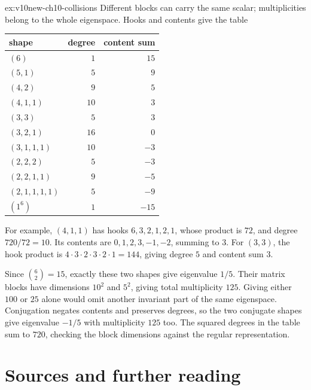 \begin{solution}{ex:v10new-ch10-collisions}
\idea Different blocks can carry the same scalar; multiplicities belong to the whole eigenspace.
\writeup Hooks and contents give the table
\begin{center}
\begin{tabular}{@{}lrr@{}}
shape&degree&content sum\\\hline
$(6)$&$1$&$15$\\
$(5,1)$&$5$&$9$\\
$(4,2)$&$9$&$5$\\
$(4,1,1)$&$10$&$3$\\
$(3,3)$&$5$&$3$\\
$(3,2,1)$&$16$&$0$\\
$(3,1,1,1)$&$10$&$-3$\\
$(2,2,2)$&$5$&$-3$\\
$(2,2,1,1)$&$9$&$-5$\\
$(2,1,1,1,1)$&$5$&$-9$\\
$(1^6)$&$1$&$-15$
\end{tabular}
\end{center}
For example, $(4,1,1)$ has hooks $6,3,2,1,2,1$, whose product is $72$, and degree $720/72=10$. Its contents are $0,1,2,3,-1,-2$, summing to $3$. For $(3,3)$, the hook product is $4\cdot3\cdot2\cdot3\cdot2\cdot1=144$, giving degree $5$ and content sum $3$.

Since $\binom62=15$, exactly these two shapes give eigenvalue $1/5$. Their matrix blocks have dimensions $10^2$ and $5^2$, giving total multiplicity $125$. Giving either $100$ or $25$ alone would omit another invariant part of the same eigenspace. Conjugation negates contents and preserves degrees, so the two conjugate shapes give eigenvalue $-1/5$ with multiplicity $125$ too. The squared degrees in the table sum to $720$, checking the block dimensions against the regular representation.
\end{solution}

\section*{Sources and further reading}

